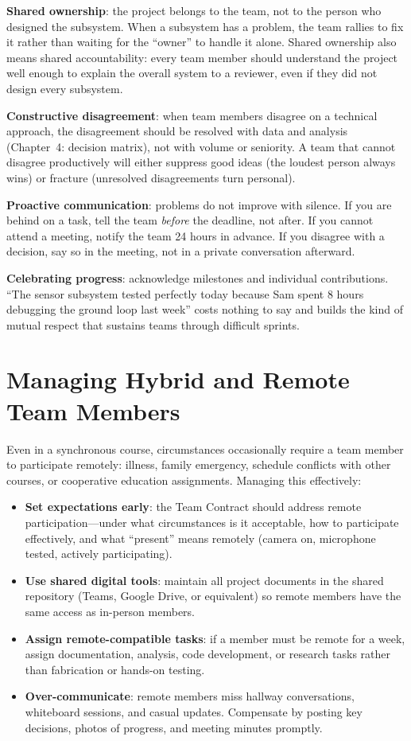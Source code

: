 \textbf{Shared ownership}: the project belongs to the team, not to the person who designed the subsystem. When a subsystem has a problem, the team rallies to fix it rather than waiting for the ``owner'' to handle it alone. Shared ownership also means shared accountability: every team member should understand the project well enough to explain the overall system to a reviewer, even if they did not design every subsystem.

\textbf{Constructive disagreement}: when team members disagree on a technical approach, the disagreement should be resolved with data and analysis (Chapter~4: decision matrix), not with volume or seniority. A team that cannot disagree productively will either suppress good ideas (the loudest person always wins) or fracture (unresolved disagreements turn personal).

\textbf{Proactive communication}: problems do not improve with silence. If you are behind on a task, tell the team \emph{before} the deadline, not after. If you cannot attend a meeting, notify the team 24 hours in advance. If you disagree with a decision, say so in the meeting, not in a private conversation afterward.

\textbf{Celebrating progress}: acknowledge milestones and individual contributions. ``The sensor subsystem tested perfectly today because Sam spent 8 hours debugging the ground loop last week'' costs nothing to say and builds the kind of mutual respect that sustains teams through difficult sprints.

\section{Managing Hybrid and Remote Team Members}
Even in a synchronous course, circumstances occasionally require a team member to participate remotely: illness, family emergency, schedule conflicts with other courses, or cooperative education assignments. Managing this effectively:

\begin{itemize}[nosep,leftmargin=1.5em]
\item \textbf{Set expectations early}: the Team Contract should address remote participation---under what circumstances is it acceptable, how to participate effectively, and what ``present'' means remotely (camera on, microphone tested, actively participating).
\item \textbf{Use shared digital tools}: maintain all project documents in the shared repository (Teams, Google Drive, or equivalent) so remote members have the same access as in-person members.
\item \textbf{Assign remote-compatible tasks}: if a member must be remote for a week, assign documentation, analysis, code development, or research tasks rather than fabrication or hands-on testing.
\item \textbf{Over-communicate}: remote members miss hallway conversations, whiteboard sessions, and casual updates. Compensate by posting key decisions, photos of progress, and meeting minutes promptly.
\end{itemize}

